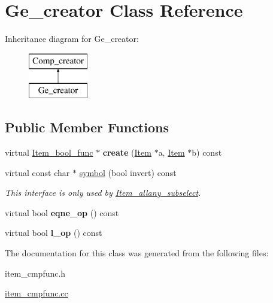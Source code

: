 \hypertarget{classGe__creator}{}\section{Ge\+\_\+creator Class Reference}
\label{classGe__creator}
Inheritance diagram for Ge\+\_\+creator\+:\begin{figure}[H]
\begin{center}
\leavevmode
\includegraphics[height=2.000000cm]{classGe__creator}
\end{center}
\end{figure}
\subsection*{Public Member Functions}
\begin{DoxyCompactItemize}
\item 
\mbox{\label{classGe__creator_a0eb198caf40af365d7cbdfb2a59be424}} 
virtual \mbox{\hyperlink{classItem__bool__func}{Item\+\_\+bool\+\_\+func}} $\ast$ {\bfseries create} (\mbox{\hyperlink{classItem}{Item}} $\ast$a, \mbox{\hyperlink{classItem}{Item}} $\ast$b) const
\item 
\mbox{\label{classGe__creator_a050514055fefcbc3d8f981629046d67c}} 
virtual const char $\ast$ \mbox{\hyperlink{classGe__creator_a050514055fefcbc3d8f981629046d67c}{symbol}} (bool invert) const
\begin{DoxyCompactList}\small\item\em This interface is only used by \mbox{\hyperlink{classItem__allany__subselect}{Item\+\_\+allany\+\_\+subselect}}. \end{DoxyCompactList}\item 
\mbox{\label{classGe__creator_a3b61e80e0d813605203715c28787057b}} 
virtual bool {\bfseries eqne\+\_\+op} () const
\item 
\mbox{\label{classGe__creator_ad4dead8468e9ee7a731f488caab637d7}} 
virtual bool {\bfseries l\+\_\+op} () const
\end{DoxyCompactItemize}


The documentation for this class was generated from the following files\+:\begin{DoxyCompactItemize}
\item 
item\+\_\+cmpfunc.\+h\item 
\mbox{\hyperlink{item__cmpfunc_8cc}{item\+\_\+cmpfunc.\+cc}}\end{DoxyCompactItemize}
